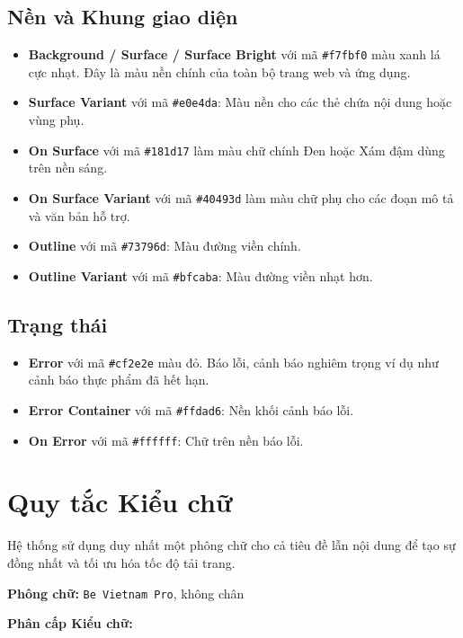\documentclass[12pt,a4paper]{article}
\newcommand{\code}[1]{\texttt{#1}}
\begin{document}
\subsection{Nền và Khung giao diện}
\begin{itemize}[leftmargin=*]
  \item \textbf{Background / Surface / Surface Bright} với mã \code{\#f7fbf0} màu xanh lá cực nhạt. Đây là màu nền chính của toàn bộ trang web và ứng dụng.
  \item \textbf{Surface Variant} với mã \code{\#e0e4da}: Màu nền cho các thẻ chứa nội dung hoặc vùng phụ.
  \item \textbf{On Surface} với mã \code{\#181d17} làm màu chữ chính Đen hoặc Xám đậm dùng trên nền sáng.
  \item \textbf{On Surface Variant} với mã \code{\#40493d} làm màu chữ phụ cho các đoạn mô tả và văn bản hỗ trợ.
  \item \textbf{Outline} với mã \code{\#73796d}: Màu đường viền chính.
  \item \textbf{Outline Variant} với mã \code{\#bfcaba}: Màu đường viền nhạt hơn.
\end{itemize}

\subsection{Trạng thái}
\begin{itemize}[leftmargin=*]
  \item \textbf{Error} với mã \code{\#cf2e2e} màu đỏ. Báo lỗi, cảnh báo nghiêm trọng ví dụ như cảnh báo thực phẩm đã hết hạn.
  \item \textbf{Error Container} với mã \code{\#ffdad6}: Nền khối cảnh báo lỗi.
  \item \textbf{On Error} với mã \code{\#ffffff}: Chữ trên nền báo lỗi.
\end{itemize}

\section{Quy tắc Kiểu chữ}
Hệ thống sử dụng duy nhất một phông chữ cho cả tiêu đề lẫn nội dung để tạo sự đồng nhất và tối ưu hóa tốc độ tải trang.

\textbf{Phông chữ:} \code{Be Vietnam Pro}, không chân

\textbf{Phân cấp Kiểu chữ:}
\end{document}
